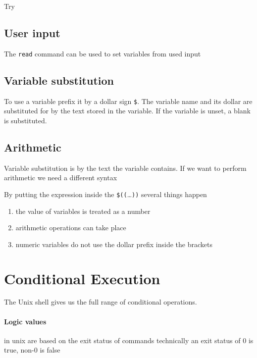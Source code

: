 \documentclass[12pt,a4paper]{article}
\begin{document}
Try


\subsection{User input}
The \texttt{read} command can be used to set variables from used input

\subsection{Variable substitution}
To use a variable prefix it by a dollar sign \texttt{\$}.  The
variable name and its dollar are substituted for by the text stored in
the variable.  If the variable is unset, a blank is substituted.


\subsection{Arithmetic}
Variable substitution is by the text the variable contains.  If we
want to perform arithmetic we need a different syntax
 
By putting the expression inside the \texttt{\$((}\ldots\texttt{))}
several things happen
\begin{enumerate}
\item the value of variables is treated as a number
\item arithmetic operations can take place
\item numeric variables do not use the dollar prefix inside the brackets
\end{enumerate}

\section{Conditional Execution}
The Unix shell gives us the full range of conditional operations.

\paragraph{Logic values} in unix are based on the exit status of
commands technically an exit status of 0 is true, non-0 is
  false
\end{document}
